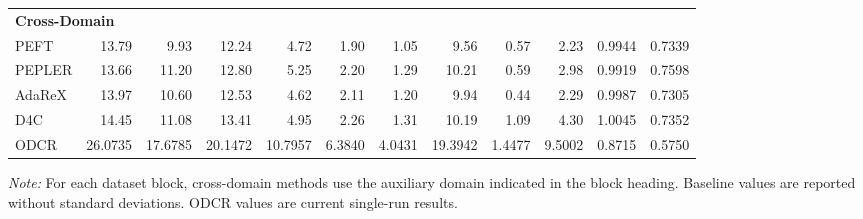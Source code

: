 \begin{table}[t]
{\begin{tabular}{lrrrrrrrrrrr}
\midrule
\multicolumn{12}{l}{\textbf{Cross-Domain}} \\
PEFT & 13.79 & 9.93 & 12.24 & 4.72 & 1.90 & 1.05 & 9.56 & 0.57 & 2.23 & 0.9944 & 0.7339 \\
PEPLER & 13.66 & 11.20 & 12.80 & 5.25 & 2.20 & 1.29 & 10.21 & 0.59 & 2.98 & 0.9919 & 0.7598 \\
AdaReX & 13.97 & 10.60 & 12.53 & 4.62 & 2.11 & 1.20 & 9.94 & 0.44 & 2.29 & 0.9987 & 0.7305 \\
D4C & 14.45 & 11.08 & 13.41 & 4.95 & 2.26 & 1.31 & 10.19 & 1.09 & 4.30 & 1.0045 & 0.7352 \\
ODCR & 26.0735 & 17.6785 & 20.1472 & 10.7957 & 6.3840 & 4.0431 & 19.3942 & 1.4477 & 9.5002 & 0.8715 & 0.5750 \\
\bottomrule
\end{tabular}%
}
\vspace{2pt}
\parbox{\textwidth}{\scriptsize \textit{Note:} For each dataset block, cross-domain methods use the auxiliary domain indicated in the block heading. Baseline values are reported without standard deviations. ODCR values are current single-run results.}
\label{tab:overall_performance_amazon}
\end{table}
